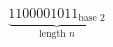 \documentclass[preview]{standalone}
\begin{document}
\begin{align*}
\underbrace{1100001011_{\text{base } 2}}_{\text{length } n}
\end{align*}
\end{document}
